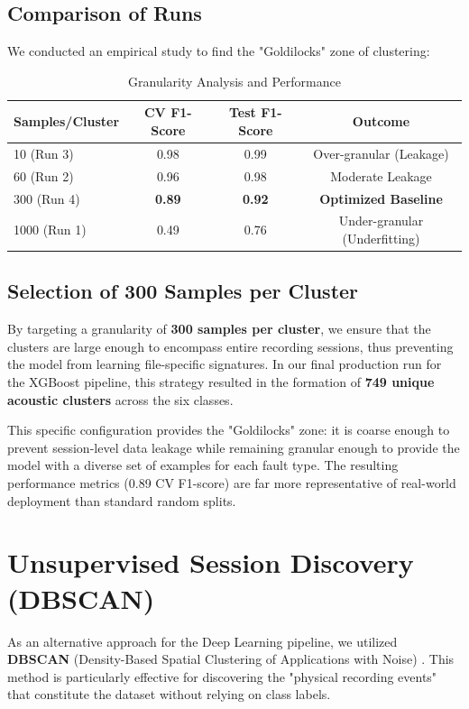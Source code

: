 \subsection{Comparison of Runs}
We conducted an empirical study to find the "Goldilocks" zone of clustering:
\begin{table}[H]
    \centering
    \caption{Granularity Analysis and Performance}
    \begin{tabular}{@{}lccc@{}}
        \toprule
        \textbf{Samples/Cluster} & \textbf{CV F1-Score} & \textbf{Test F1-Score} & \textbf{Outcome} \\ \midrule
        10 (Run 3) & 0.98 & 0.99 & Over-granular (Leakage) \\
        60 (Run 2) & 0.96 & 0.98 & Moderate Leakage \\
        300 (Run 4) & \textbf{0.89} & \textbf{0.92} & \textbf{Optimized Baseline} \\
        1000 (Run 1) & 0.49 & 0.76 & Under-granular (Underfitting) \\ \bottomrule
    \end{tabular}
\end{table}

\subsection{Selection of 300 Samples per Cluster}
By targeting a granularity of \textbf{300 samples per cluster}, we ensure that the clusters are large enough to encompass entire recording sessions, thus preventing the model from learning file-specific signatures. In our final production run for the XGBoost pipeline, this strategy resulted in the formation of \textbf{749 unique acoustic clusters} across the six classes. 

This specific configuration provides the "Goldilocks" zone: it is coarse enough to prevent session-level data leakage while remaining granular enough to provide the model with a diverse set of examples for each fault type. The resulting performance metrics (0.89 CV F1-score) are far more representative of real-world deployment than standard random splits.

\section{Unsupervised Session Discovery (DBSCAN)}
As an alternative approach for the Deep Learning pipeline, we utilized \textbf{DBSCAN} (Density-Based Spatial Clustering of Applications with Noise) \cite{dbscan1996}. This method is particularly effective for discovering the "physical recording events" that constitute the dataset without relying on class labels.

